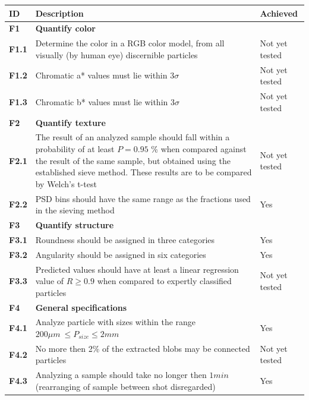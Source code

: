 \documentclass[11pt,fleqn,,a4paper,twoside,openright]{book}
\begin{document}
\begin{longtable}{|p{1cm}| p{9cm} p{2.5cm}|}
	\hline 
	\textbf{ID} & \textbf{Description} & \textbf{Achieved} \\
	\endhead
	\hline
	\textbf{F1}\label{F1} & \textbf{Quantify color} &  \\ 
	\hline 
	\textbf{F1.1}\label{F1.1} & Determine the color in a RGB color model, from all visually (by human eye) discernible particles & Not yet tested \\ 
	\hline
	\textbf{F1.2}\label{F1.2} & Chromatic a* values must lie within $3 \sigma$ & Not yet tested \\ 
	\hline 
	\textbf{F1.3}\label{F1.3} & Chromatic b* values must lie within $3 \sigma$ & Not yet tested \\ 
	\hline 
	\textbf{F2}\label{F2} & \textbf{Quantify texture} &  \\ 
	\hline 
	\textbf{F2.1}\label{F2.1} & The result of an analyzed sample should fall within a probability of at least $P = 0.95$ \% when compared against the result of the same sample, but obtained using the established sieve method. These results are to be compared by Welch's t-test  &  Not yet tested \\ 
	\hline 
	\textbf{F2.2}\label{F2.2} & PSD bins should have the same range as the fractions used in the sieving method & Yes \\
	\hline 
	\textbf{F3}\label{F3} & \textbf{Quantify structure}  &  \\ 
	\hline 
	\textbf{F3.1}\label{F3.1} & Roundness should be assigned in three categories  & Yes \\ 
	\hline 
	\textbf{F3.2}\label{F3.2} & Angularity should be assigned in six categories  & Yes \\ 
	\hline 
	\textbf{F3.3}\label{F3.3} & Predicted values should have at least a linear regression value of $ R \geq 0.9 $ when compared to expertly classified particles & Not yet tested  \\ 
	\hline 
	\textbf{F4}\label{F4} & \textbf{General specifications} &  \\ 
	\hline 
	\textbf{F4.1}\label{F4.1} & Analyze particle with sizes within the range $ 200 \mu m\ \leq P_{size} \leq 2 mm $& Yes \\ 
	\hline 
	\textbf{F4.2}\label{F4.2} & No more then 2\% of the extracted blobs may be connected particles & Not yet tested \\ 
	\hline 
	\textbf{F4.3}\label{F4.3} & Analyzing a sample should take no longer then $ 1 min$ (rearranging of sample between shot disregarded) & Yes\\

\end{longtable}
\end{document}
